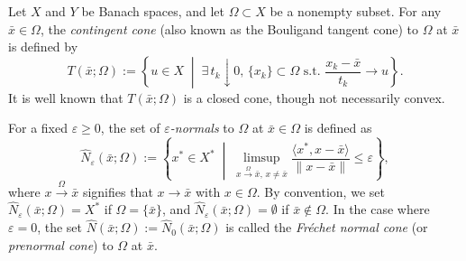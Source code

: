 \documentclass[12pt,twoside,reqno]{amsart}
\theoremstyle{definition}
\numberwithin{equation}{section}
\begin{document}
Let $X$ and $Y$ be Banach spaces, and let $\Omega \subset X$ be a nonempty subset. For any $\bar{x} \in \Omega$, the \emph{contingent cone} (also known as the Bouligand tangent cone) to $\Omega$ at $\bar{x}$ is defined by
\begin{equation*}
    T(\bar{x}; \Omega) := \left\{ u \in X \;\middle|\; \exists\, t_k \downarrow 0, \, \{x_k\} \subset \Omega \text{ s.t. } \frac{x_k - \bar{x}}{t_k} \to u \right\}.
\end{equation*}
It is well known that $T(\bar{x}; \Omega)$ is a closed cone, though not necessarily convex.

For a fixed $\varepsilon \ge 0$, the set of \emph{$\varepsilon$-normals} to $\Omega$ at $\bar{x} \in \Omega$ is defined as
\begin{equation*}
    \widehat{N}_{\varepsilon}(\bar{x}; \Omega) := \left\{ x^* \in X^* \;\middle|\; \limsup_{x \xrightarrow{\Omega} \bar{x}, \, x \neq \bar{x}} \frac{\langle x^*, x - \bar{x} \rangle}{\|x - \bar{x}\|} \le \varepsilon \right\},
\end{equation*}
where $x \xrightarrow{\Omega} \bar{x}$ signifies that $x \to \bar{x}$ with $x \in \Omega$. By convention, we set $\widehat{N}_{\varepsilon}(\bar{x}; \Omega) = X^*$ if $\Omega = \{\bar{x}\}$, and $\widehat{N}_{\varepsilon}(\bar{x}; \Omega) = \emptyset$ if $\bar{x} \notin \Omega$. In the case where $\varepsilon = 0$, the set $\widehat{N}(\bar{x}; \Omega) := \widehat{N}_0(\bar{x}; \Omega)$ is called the \emph{Fr\'echet normal cone} (or \emph{prenormal cone}) to $\Omega$ at $\bar{x}$.
\end{document}
